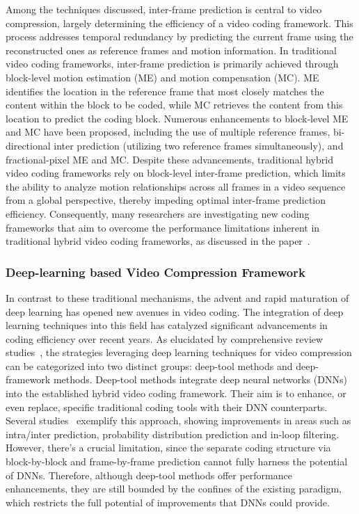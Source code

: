Among the techniques discussed, inter-frame prediction is central to video compression, largely determining the efficiency of a video coding framework. This process addresses temporal redundancy by predicting the current frame using the reconstructed ones as reference frames and motion information. In traditional video coding frameworks, inter-frame prediction is primarily achieved through block-level motion estimation (ME) and motion compensation (MC). ME identifies the location in the reference frame that most closely matches the content within the block to be coded, while MC retrieves the content from this location to predict the coding block. Numerous enhancements to block-level ME and MC have been proposed, including the use of multiple reference frames, bi-directional inter prediction (utilizing two reference frames simultaneously), and fractional-pixel ME and MC. Despite these advancements, traditional hybrid video coding frameworks rely on block-level inter-frame prediction, which limits the ability to analyze motion relationships across all frames in a video sequence from a global perspective, thereby impeding optimal inter-frame prediction efficiency. Consequently, many researchers are investigating new coding frameworks that aim to overcome the performance limitations inherent in traditional hybrid video coding frameworks, as discussed in the paper~\cite{DBLP:journals/tcsv/ZhangZFMCK20}.

\subsubsection{Deep-learning based Video Compression Framework}
In contrast to these traditional mechanisms, the advent and rapid maturation of deep learning has opened new avenues in video coding. The integration of deep learning techniques into this field has catalyzed significant advancements in coding efficiency over recent years. As elucidated by comprehensive review studies~\cite{DBLP:journals/csur/LiuLLLW20,DBLP:journals/tcsv/MaZJZWW20}, the strategies leveraging deep learning techniques for video compression can be categorized into two distinct groups: deep-tool methods and deep-framework methods. Deep-tool methods integrate deep neural networks (DNNs) into the established hybrid video coding framework. Their aim is to enhance, or even replace, specific traditional coding tools with their DNN counterparts. Several studies~\cite{DBLP:conf/vcip/ChenLS0CM17,DBLP:journals/tip/LiuYGCJW16,DBLP:conf/vcip/SongLLW17,DBLP:conf/eccv/LuOXZGS18,DBLP:conf/cvpr/YangXWL18,zhao2019enhanced} exemplify this approach, showing improvements in areas such as intra/inter prediction, probability distribution prediction and in-loop filtering. However, there’s a crucial limitation, since the separate coding structure via block-by-block and frame-by-frame prediction cannot fully harness the potential of DNNs. Therefore, although deep-tool methods offer performance enhancements, they are still bounded by the confines of the existing paradigm, which restricts the full potential of improvements that DNNs could provide.

